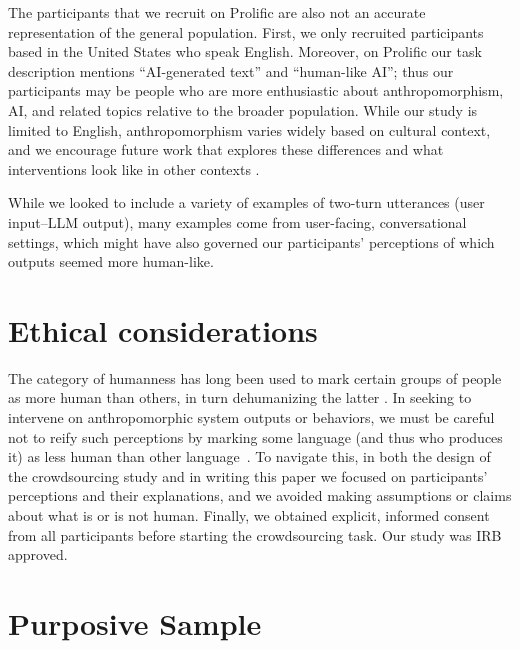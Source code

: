 \documentclass[11pt]{article}
\newcounter{intervention}  %
\newcommand{\ant}{anthropomorphism\xspace}
\begin{document}
The participants that we recruit on Prolific are also not an accurate representation of the general population. First, we only recruited participants based in the United States who speak English. Moreover, on Prolific our task description mentions ``AI-generated text'' and ``human-like AI''; thus our participants may be people who are more enthusiastic about \ant, AI, and related topics relative to the broader population.
While our study is limited to English, \ant varies widely based on cultural context, and we encourage future work that explores these differences and what interventions look like in other contexts \cite{spatola2022different,folk2023cultural}.

While we looked to include a variety of examples of two-turn utterances (user input--LLM output), many examples come from user-facing, conversational settings, which might have also governed our participants' perceptions of which outputs seemed more human-like.  


\section*{Ethical considerations}

The category of humanness has long been used to mark certain groups of people as more human than others, in turn dehumanizing the latter \citep{wynter2003unsettling}. 
In seeking to intervene on anthropomorphic system outputs or behaviors, we must be careful not to reify such perceptions by marking some language (and thus who produces it) as less human than other language~\cite{wynter2003unsettling,devrio2025taxonomy}.
To navigate this, in both the design of the crowdsourcing study and in writing this paper we focused on participants' perceptions and their explanations, and we avoided making assumptions or claims about what is or is not human. Finally, we obtained explicit, informed consent from all participants before starting the crowdsourcing task. Our study was IRB approved.




\appendix

\renewcommand{\thetable}{A\arabic{table}}

\renewcommand{\thefigure}{A\arabic{figure}}

\setcounter{figure}{0}

\setcounter{table}{0}

\section{Purposive Sample}
\end{document}
